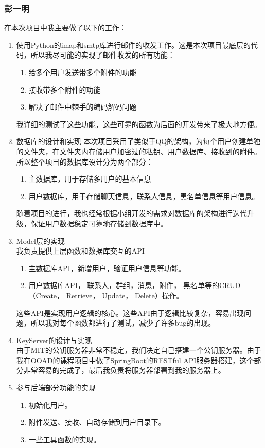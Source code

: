 \documentclass[a4paper,UTF8]{article}
\begin{document}
\subsubsection{彭一明}
在本次项目中我主要做了以下的工作：
\begin{enumerate}
\item 使用Python的imap和smtp库进行邮件的收发工作。这是本次项目最底层的代码，所以我尽可能的实现了邮件收发的所有功能：
	\begin{enumerate}
	\item 给多个用户发送带多个附件的功能
	\item 接收带多个附件的功能
	\item 解决了邮件中棘手的编码解码问题
	\end{enumerate}
	我详细的测试了这些功能，这些可靠的函数为后面的开发带来了极大地方便。

\item 数据库的设计和实现
本次项目采用了类似于QQ的架构，为每个用户创建单独的文件夹，在文件夹内存储用户加密过的私钥、用户数据库、接收到的附件。
所以整个项目的数据库设计分为两个部分：
	\begin{enumerate}
		\item 主数据库，用于存储多用户的基本信息
		\item 用户数据库，用于存储聊天信息，联系人信息，黑名单信息等用户信息。
	\end{enumerate}
随着项目的进行，我也经常根据小组开发的需求对数据库的架构进行迭代升级，保证用户数据稳定可靠地存储到数据库中。
	\item Model层的实现
	\\我负责提供上层函数和数据库交互的API
	\begin{enumerate}
		\item 主数据库API，新增用户，验证用户信息等功能。
		\item 用户数据库API， 联系人，群组，消息，附件， 黑名单等的CRUD（Create， Retrieve， Update， Delete）操作。
	\end{enumerate}
这些API是实现用户逻辑的核心。这些API由于逻辑比较复杂，容易出现问题，所以我对每个函数都进行了测试，减少了许多bug的出现。

\item KeyServer的设计与实现
\\由于MIT的公钥服务器非常不稳定，我们决定自己搭建一个公钥服务器。由于我在OOAD的课程项目中做了SpringBoot的RESTful API服务器搭建，这个部分非常容易的完成了，最后我负责将服务器部署到我的服务器上。

\item 参与后端部分功能的实现
	\begin{enumerate}
		\item 初始化用户。
		\item 附件发送、接收、自动存储到用户目录下。
		\item 一些工具函数的实现。
	\end{enumerate}
\end{enumerate}
\end{document}
